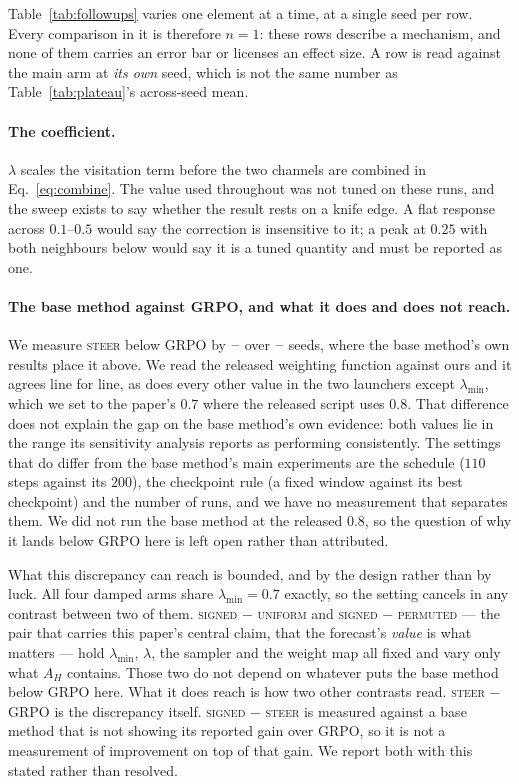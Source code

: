 \documentclass[11pt]{article}
\newcommand{\AH}{A_{H}}
\providecommand{\PENDING}{\textcolor{red}{\textbf{--}}}
\newcommand{\num}[1]{\ifcsname #1\endcsname\csname #1\endcsname\else\PENDING\fi}
\begin{document}
Table~\ref{tab:followups} varies one element at a time, at a single seed per row.
Every comparison in it is therefore $n = 1$: these rows describe a mechanism, and
none of them carries an error bar or licenses an effect size. A row is read against
the main arm at \emph{its own} seed, which is not the same number as
Table~\ref{tab:plateau}'s across-seed mean.


\paragraph{The coefficient.} $\lambda$ scales the visitation term before the two
channels are combined in Eq.~\eqref{eq:combine}. The value used throughout was not
tuned on these runs, and the sweep exists to say whether the result rests on a knife
edge. A flat response across $0.1$--$0.5$ would say the correction is insensitive to it;
a peak at $0.25$ with both neighbours below would say it is a tuned quantity and must
be reported as one.

\paragraph{The base method against GRPO, and what it does and does not reach.} We
measure \textsc{steer} below GRPO by $\num{Csteergrpoacc}$ over
$\num{Nseedsused}$ seeds, where the base method's own results place it above. We
read the released weighting function against ours and it agrees line for line, as
does every other value in the two launchers except $\lambda_{\min}$, which we set to
the paper's $0.7$ where the released script uses $0.8$. That difference does not
explain the gap on the base method's own evidence: both values lie in the range its
sensitivity analysis reports as performing consistently. The settings that do differ
from the base method's main experiments are the schedule ($110$ steps against its
$200$), the checkpoint rule (a fixed window against its best checkpoint) and the
number of runs, and we have no measurement that separates them. We did not run the
base method at the released $0.8$, so the question of why it lands below GRPO here
is left open rather than attributed.

What this discrepancy can reach is bounded, and by the design rather than by
luck. All four damped arms share $\lambda_{\min} = 0.7$ exactly, so the setting
cancels in any contrast between two of them. \textsc{signed} $-$ \textsc{uniform} and \textsc{signed} $-$
\textsc{permuted} --- the pair that carries this paper's central claim, that the
forecast's \emph{value} is what matters --- hold $\lambda_{\min}$, $\lambda$,
the sampler and the weight map all fixed and vary only what $\AH$ contains. Those
two do not depend on whatever puts the base method below GRPO here. What it does
reach is how two other contrasts read. \textsc{steer} $-$ GRPO is the discrepancy
itself. \textsc{signed} $-$ \textsc{steer} is measured against a base method that is not
showing its reported gain over GRPO, so it is not a measurement of improvement on
top of that gain. We report both with this stated rather than resolved.
\end{document}
